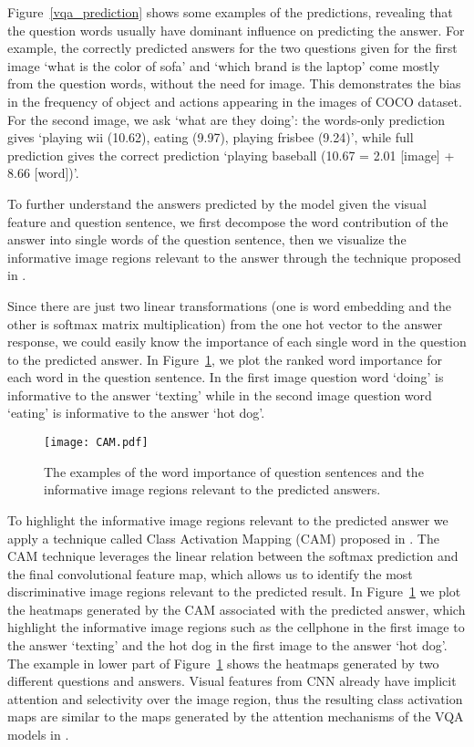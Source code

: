 \documentclass{article} \usepackage{nips14submit_e,times}
\begin{document}
Figure~\ref{vqa_prediction} shows some examples of the predictions, revealing that the question words usually have dominant influence on predicting the answer. For example, the correctly predicted answers for the two questions given for the first image `what is the color of sofa' and `which brand is the laptop' come mostly from the question words, without the need for image. This demonstrates the bias in the frequency of object and actions appearing in the images of COCO dataset. For the second image, we ask `what are they doing': the words-only prediction gives `playing wii (10.62), eating (9.97), playing frisbee (9.24)', while full prediction gives the correct prediction `playing baseball (10.67 = 2.01 [image] + 8.66 [word])'.  

To further understand the answers predicted by the model given the visual feature and question sentence, we first decompose the word contribution of the answer into single words of the question sentence, then we visualize the informative image regions relevant to the answer through the technique proposed in \cite{zhou2015localizable}. 

Since there are just two linear transformations (one is word embedding and the other is softmax matrix multiplication) from the one hot vector to the answer response, we could easily know the importance of each single word in the question to the predicted answer. In Figure~\ref{CAM}, we plot the ranked word importance for each word in the question sentence. In the first image question word `doing' is informative to the answer `texting' while in the second image question word `eating' is informative to the answer `hot dog'. 

\begin{figure}
\begin{center}
\texttt{[image: CAM.pdf]}
\end{center}
\caption{The examples of the word importance of question sentences and the informative image regions relevant to the predicted answers.}\label{CAM}
\end{figure}

To highlight the informative image regions relevant to the predicted answer we apply a technique called Class Activation Mapping (CAM) proposed in \cite{zhou2015localizable}. The CAM technique leverages the linear relation between the softmax prediction and the final convolutional feature map, which allows us to identify the most discriminative image regions relevant to the predicted result. In Figure~\ref{CAM} we plot the heatmaps generated by the CAM associated with the predicted answer, which highlight the informative image regions such as the cellphone in the first image to the answer `texting' and the hot dog in the first image to the answer `hot dog'. The example in lower part of Figure~\ref{CAM} shows the heatmaps generated by two different questions and answers. Visual features from CNN already have implicit attention and selectivity over the image region, thus the resulting class activation maps are similar to the maps generated by the attention mechanisms of the VQA models in \cite{shih2015look,xu2015ask,yang2015stacked}. 
\end{document}
